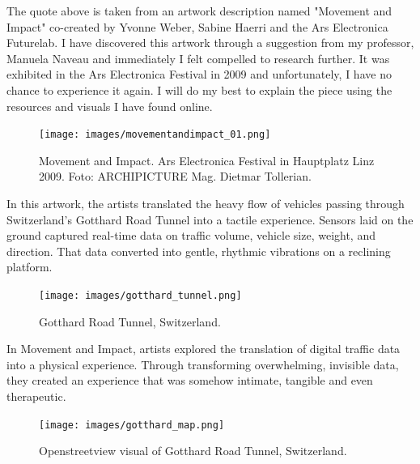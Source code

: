                 The quote above is taken from an artwork description named "Movement and Impact" co-created by Yvonne Weber, Sabine Haerri and the Ars Electronica Futurelab. I have discovered this artwork through a suggestion from my professor, Manuela Naveau and immediately I felt compelled to research further. It was exhibited in the Ars Electronica Festival in 2009 and unfortunately, I have no chance to experience it again. I will do my best to explain the piece using the resources and visuals I have found online.\par

                \begin{figure}[H]
                    \centering
                    \texttt{[image: images/movementandimpact\_01.png]}
                    \caption{Movement and Impact. Ars Electronica Festival in Hauptplatz Linz 2009. Foto: ARCHIPICTURE Mag. Dietmar Tollerian.}
                    \label{fig:MOVNIMP}
                \end{figure}   

                In this artwork, the artists translated the heavy flow of vehicles passing through Switzerland's Gotthard Road Tunnel into a tactile experience. Sensors laid on the ground captured real-time data on traffic volume, vehicle size, weight, and direction. That data converted into gentle, rhythmic vibrations on a reclining platform\cite{Movement_and_Impact_ARS}.\par

                \begin{figure}[H]
                    \centering
                    \texttt{[image: images/gotthard\_tunnel.png]}
                    \caption{Gotthard Road Tunnel, Switzerland.}
                    \label{fig:GOTTHARD}
                \end{figure}  

                In Movement and Impact, artists explored the translation of digital traffic data into a physical experience. Through transforming overwhelming, invisible data, they created an experience that was somehow intimate, tangible and even therapeutic.\par

                \begin{figure}[H]
                    \centering
                    \texttt{[image: images/gotthard\_map.png]}
                    \caption{Openstreetview visual of Gotthard Road Tunnel, Switzerland.}
                    \label{fig:GOTTHARD_02}
                \end{figure}  

